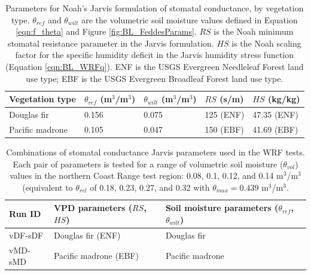 \begin{table}
\begin{tabular}{ l p{3cm} p{3cm} p{2cm} p{3cm} }
\hline
Vegetation type & $\theta_{ref}$ (m$^3$/m$^3$) & $\theta_{wilt}$ (m$^3$/m$^3$) & $RS$ (s/m) & $HS$ (kg/kg)\\ \hline
Douglas fir & 0.156 & 0.075 & 125 (ENF) & 47.35 (ENF)\\
Pacific madrone & 0.105 & 0.047 & 150 (EBF) & 41.69 (EBF)\\
\hline
\end{tabular}
\caption{Parameters for Noah's Jarvis formulation of stomatal conductance, by vegetation type.  $\theta_{ref}$ and $\theta_{wilt}$ are the volumetric soil moisture values defined in Equation \ref{eqn:f_theta} and Figure \ref{fig:BL_FeddesParams}.  $RS$ is the Noah minimum stomatal resistance parameter in the Jarvis formulation. $HS$ is the Noah scaling factor for the specific humidity deficit in the Jarvis humidity stress function (Equation \ref{eqn:BL_WRFq}).  ENF is the USGS Evergreen Needleleaf Forest land use type; EBF is the USGS Evergreen Broadleaf Forest land use type.}
\label{table:BL_NoahJarvisparams}
\end{table}

\begin{table}
\begin{tabular}{ l p{6cm} p{7cm} }
\hline
Run ID & VPD parameters ($RS$, $HS$) & Soil moisture parameters ($\theta_{ref}$, $\theta_{wilt}$)\\ \hline
vDF-sDF & Douglas fir (ENF) & Douglas fir\\
vMD-sMD & Pacific madrone (EBF) & Pacific madrone\\
\hline
\end{tabular}
\caption{Combinations of stomatal conductance Jarvis parameters used in the WRF tests.  Each pair of parameters is tested for a range of volumetric soil moisture ($\theta_{vol}$) values in the northern Coast Range test region: 0.08, 0.1, 0.12, and 0.14 m$^3$/m$^3$ (equivalent to $\theta_{rel}$ of 0.18, 0.23, 0.27, and 0.32 with $\theta_{max} = 0.439$ m$^3$/m$^3$.}
\label{table:BL_WRFruns}
\end{table}

